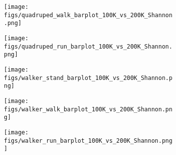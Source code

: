 \begin{figure}
    \begin{subfigure}{0.49\textwidth}
        \texttt{[image: figs/quadruped\_walk\_barplot\_100K\_vs\_200K\_Shannon.png]}
        \label{fig:orl_appendix:quad_walk_average}
    \end{subfigure}
    \hfill
    \begin{subfigure}{0.49\textwidth}
        \texttt{[image: figs/quadruped\_run\_barplot\_100K\_vs\_200K\_Shannon.png]}
        \label{fig:orl_appendix:quad_run_average}
    \end{subfigure}
    
    \medskip
    \begin{subfigure}{0.49\textwidth}
        \texttt{[image: figs/walker\_stand\_barplot\_100K\_vs\_200K\_Shannon.png]}
        \label{fig:orl_appendix:walker_stand_average}
    \end{subfigure}
    \hfill
    \begin{subfigure}{0.49\textwidth}
        \texttt{[image: figs/walker\_walk\_barplot\_100K\_vs\_200K\_Shannon.png]}
        \label{fig:orl_appendix:walker_walk_average}
    \end{subfigure}
    
    \medskip
    \centering
    \begin{subfigure}{0.49\textwidth}
        \texttt{[image: figs/walker\_run\_barplot\_100K\_vs\_200K\_Shannon.png]}
    \end{subfigure}
    \caption{  }
    \label{fig:orl_average_appendix}
\end{figure}



